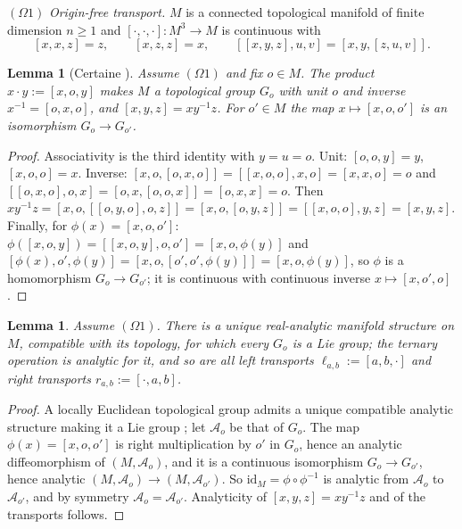 \documentclass[11pt,reqno]{amsart}
\newtheorem{lemma}[theorem]{Lemma}
\theoremstyle{definition}
\theoremstyle{remark}
\numberwithin{equation}{section}
\newcommand{\hp}[3]{[#1,#2,#3]}
\begin{document}
\smallskip\noindent$(\Omega1)$ \emph{Origin-free transport.}  $M$ is a connected topological manifold of
finite dimension $n\ge1$ and $\hp\cdot\cdot\cdot\colon M^3\to M$ is continuous with
\[
\hp xxz=z,\qquad \hp xzz=x,\qquad \hp{\hp xyz}uv=\hp xy{\hp zuv}.
\]

\begin{lemma}[Certaine \cite{Certaine}]\label{lem:certaine}
Assume $(\Omega1)$ and fix $o\in M$.  The product $x\cdot y:=\hp xoy$ makes $M$ a topological group $G_o$
with unit $o$ and inverse $x^{-1}=\hp oxo$, and $\hp xyz=xy^{-1}z$.  For $o'\in M$ the map
$x\mapsto\hp xo{o'}$ is an isomorphism $G_o\to G_{o'}$.
\end{lemma}
\begin{proof}
Associativity is the third identity with $y=u=o$.  Unit: $\hp ooy=y$, $\hp xoo=x$.  Inverse:
$\hp xo{\hp oxo}=\hp{\hp xoo}xo=\hp xxo=o$ and $\hp{\hp oxo}ox=\hp ox{\hp oox}=\hp oxx=o$.  Then
$xy^{-1}z=\hp xo{\hp{\hp oyo}oz}=\hp xo{\hp oyz}=\hp{\hp xoo}yz=\hp xyz$.  Finally, for
$\phi(x)=\hp xo{o'}$: $\phi(\hp xoy)=\hp{\hp xoy}o{o'}=\hp xo{\phi(y)}$ and
$\hp{\phi(x)}{o'}{\phi(y)}=\hp xo{\hp{o'}{o'}{\phi(y)}}=\hp xo{\phi(y)}$, so $\phi$ is a homomorphism
$G_o\to G_{o'}$; it is continuous with continuous inverse $x\mapsto\hp x{o'}o$.
\end{proof}

\begin{lemma}\label{lem:lie}
Assume $(\Omega1)$.  There is a unique real-analytic manifold structure on $M$, compatible with its
topology, for which every $G_o$ is a Lie group; the ternary operation is analytic for it, and so are all
left transports $\ell_{a,b}:=\hp ab\cdot$ and right transports $r_{a,b}:=\hp\cdot ab$.
\end{lemma}
\begin{proof}
A locally Euclidean topological group admits a unique compatible analytic structure making it a Lie
group \cite{Gleason52,MZ}; let $\mathcal A_o$ be that of $G_o$.  The map $\phi(x)=\hp xo{o'}$ is right
multiplication by $o'$ in $G_o$, hence an analytic diffeomorphism of $(M,\mathcal A_o)$, and it is a
continuous isomorphism $G_o\to G_{o'}$, hence analytic $(M,\mathcal A_o)\to(M,\mathcal A_{o'})$.  So
$\mathrm{id}_M=\phi\circ\phi^{-1}$ is analytic from $\mathcal A_o$ to $\mathcal A_{o'}$, and by symmetry
$\mathcal A_o=\mathcal A_{o'}$.  Analyticity of $\hp xyz=xy^{-1}z$ and of the transports follows.
\end{proof}
\end{document}
